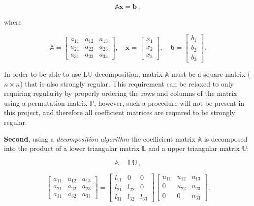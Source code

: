 \begin{equation}\label{Equation:theory-LU-decomposition-system-linear-equations-matrix-form-Axb}
	\mathbb{A}\textbf{x} = \textbf{b}\,,
\end{equation}

where

\begin{equation}
	\mathbb{A} = 
	\begin{bmatrix}
		a_{11} & a_{12} & a_{13} \\
		a_{21} & a_{22} & a_{23} \\
		a_{31} & a_{32} & a_{33}
	\end{bmatrix}
	,\quad
	\mathbf{x} = 
	\begin{bmatrix}
		x_{1} \\
		x_{2} \\
		x_{3}
	\end{bmatrix}
	,\quad
	\mathbf{b} = 
	\begin{bmatrix}
		b_{1} \\
		b_{2} \\
		b_{3}
	\end{bmatrix}.
\end{equation}

In order to be able to use LU decomposition, matrix $ \mathbb{A} $ must be a square matrix ($ n\times n $) that is also strongly regular. This requirement can be relaxed to only requiring regularity by properly ordering the rows and columns of the matrix using a permutation matrix $ \mathbb{P} $, however, such a procedure will not be present in this project, and therefore all coefficient matrices are required to be strongly regular.
\par \textbf{Second}, using a \textit{decomposition algorithm} the coefficient matrix $ \mathbb{A} $ is decomposed into the product of a lower triangular matrix $ \mathbb{L} $ and a upper triangular matrix $ \mathbb{U} $:

\begin{equation}
	\mathbb{A} = \mathbb{LU}\,,
\end{equation}

\begin{equation}
	\begin{bmatrix}
		a_{11} & a_{12} & a_{13} \\
		a_{21} & a_{22} & a_{23} \\
		a_{31} & a_{32} & a_{33}
	\end{bmatrix}
	=
	\begin{bmatrix}
		l_{11} & 0      & 0          \\
		l_{21} & l_{22} & 0          \\
		l_{31} & l_{32} & l_{33}
	\end{bmatrix}
	\begin{bmatrix}
		u_{11} & u_{12} & u_{13} \\
		0      & u_{22} & u_{23} \\
		0      & 0      & u_{33}
	\end{bmatrix}.
\end{equation}

